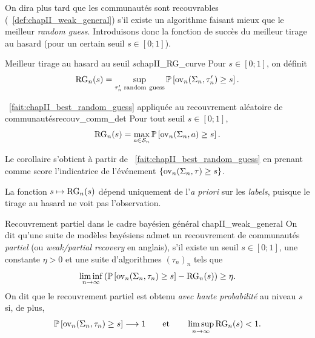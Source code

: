 On dira plus tard que les communautés sont recouvrables (\Def~\ref{def:chapII_weak_general}) s'il existe un algorithme faisant mieux que le meilleur \emph{random guess}. Introduisons donc la fonction de succès du meilleur tirage au hasard (pour un certain seuil $s \in [0 ; 1]$).

\begin{Definition}{Meilleur tirage au hasard au seuil $s$}{chapII_RG_curve}
Pour $s\in[0;1]$, on définit
\begin{equation}
    \operatorname{RG}_n(s)
    =
    \sup_{\tau_n'\;\mathrm{random\ guess}}
    \mathbb P\left[\operatorname{ov}_n(\Sigma_n,\tau_n')\ge s\right].
    \label{eq:chapII_RG_curve}
\end{equation}
\end{Definition}
\begin{Corollaire}{\Fact~\ref{fait:chapII_best_random_guess} appliquée au recouvrement aléatoire de communautés}{recouv_comm_det}
Pour tout seuil $s\in[0;1]$,
\begin{equation}
    \RG_n(s) = %
    \max_{a\in\Conf_n}
    \mathbb P\left[\ov_n(\Sigma_n,a)\ge s\right].
    \label{eq:chapII_best_guess_proba}
\end{equation}    

\end{Corollaire}
\begin{preuve}
Le corollaire s'obtient à partir de \Fact~\ref{fait:chapII_best_random_guess} en prenant comme score l'indicatrice de l'événement $\{\operatorname{ov}_n(\Sigma_n,\tau)\ge s\}$.
\end{preuve}

La fonction $s\mapsto\operatorname{RG}_n(s)$ dépend uniquement de l'\emph{a priori} sur les \emph{labels}, puisque le tirage au hasard ne voit pas l'observation.

\begin{Definition}{Recouvrement partiel dans le cadre bayésien général \cite{SankararamanBaccelli2018}}{chapII_weak_general}
On dit qu'une suite de modèles bayésiens admet un recouvrement de communautés \emph{partiel} (ou \emph{weak/partial recovery} en anglais), s'il existe un seuil $s\in[0;1]$, une constante $\eta>0$ et une suite d'algorithmes $(\tau_n)_n$ tels que
\begin{equation}
    \liminf_{n\to\infty}
    \left(
        \mathbb P\left[\operatorname{ov}_n(\Sigma_n,\tau_n)\ge s\right]
        -
        \operatorname{RG}_n(s)
    \right)
    \ge \eta.
    \label{eq:chapII_weak_general_probability}
\end{equation}
On dit que le recouvrement partiel est obtenu \emph{avec haute probabilité} au niveau $s$ si, de plus,
\begin{equation}
    \mathbb P\left[\operatorname{ov}_n(\Sigma_n,\tau_n)\ge s\right]\longrightarrow1
    \qquad\text{et}\qquad
    \limsup_{n\to\infty}\operatorname{RG}_n(s)<1.
    \label{eq:chapII_weak_general_high_probability}
\end{equation}
\end{Definition}

